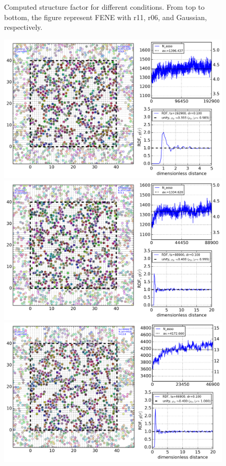 \documentclass[10pt, a4paper]{article}
\begin{document}
\begin{appendices}
\begin{figure}
      \caption{Computed structure factor for different conditions. From top to bottom, the figure represent FENE with r11, r06, and Gaussian, respectively.}
      \label{fig:2d_Sq_compare_all}
    \end{figure}


    \begin{figure}
      \centering
      \includegraphics[height=0.3\textheight]{figures/traj_r11.png}\\
      \includegraphics[height=0.3\textheight]{figures/traj_r06.png}\\
      \includegraphics[height=0.3\textheight]{figures/traj_GAUSSIAN.png}

\end{figure}
\end{appendices}
\end{document}
